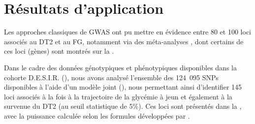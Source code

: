 \documentclass[11pt, a4paper]{article}
\begin{document}
\section{Résultats d'application}
\begin{figure}[ht]
    \begin{center}
        \label{fig:gwas}
    \end{center}
\end{figure}
\par{Les approches classiques de GWAS ont pu mettre en évidence entre 80 et 100 loci associés au DT2 et au FG, notamment via des méta-analyses \citep{yaghootkar_recent_2013, dupuis_new_2010, vaxillaire_type_2014},
dont certains de ces loci (gènes) sont montrés sur la .}
\par{Dans le cadre des données génotypiques et phénotypiques disponibles dans la cohorte D.E.S.I.R. (),
nous avons analysé l'ensemble des 124~095 SNPs disponibles à l'aide d'un modèle joint (),
nous permettant ainsi d'identifier 145 loci associés à la fois à la trajectoire de la glycémie à jeun et également à la survenue du DT2 (au seuil statistique de 5\%).
Ces loci sont présentés dans la , avec la puissance calculée selon les formules développées par \citet{chen_sample_2011}.}
\end{document}
